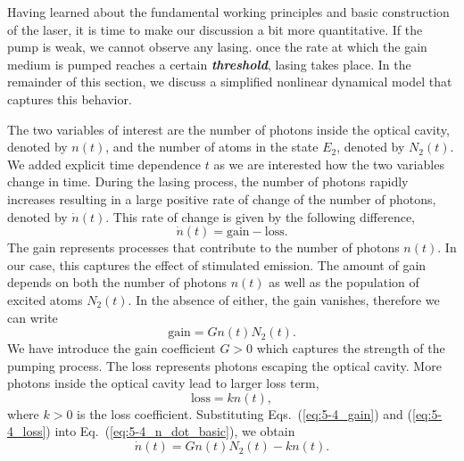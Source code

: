 Having learned about the fundamental working principles and basic construction of the laser, it is time to make our discussion a bit more quantitative.
If the pump is weak, we cannot observe any lasing.
once the rate at which the gain medium is pumped reaches a certain \textit{\textbf{threshold}}, lasing takes place.
In the remainder of this section, we discuss a simplified nonlinear dynamical model that captures this behavior.

The two variables of interest are the number of photons inside the optical cavity, denoted by $n(t)$, and the number of atoms in the state $E_2$, denoted by $N_2(t)$.
We added explicit time dependence $t$ as we are interested how the two variables change in time.
During the lasing process, the number of photons rapidly increases resulting in a large  positive rate of change of the number of photons, denoted by $\dot{n}(t)$.
This rate of change is given by the following difference,
\begin{equation}
    \dot{n}(t) = \text{gain} - \text{loss}.
    \label{eq:5-4_n_dot_basic}
\end{equation}
The gain represents processes that contribute to the number of photons $n(t)$.
In our case, this captures the effect of stimulated emission.
The amount of gain depends on both the number of photons $n(t)$ as well as the population of excited atoms $N_2(t)$.
In the absence of either, the gain vanishes, therefore we can write
\begin{equation}
    \text{gain} = G n (t) N_2(t).
    \label{eq:5-4_gain}
\end{equation}
We have introduce the gain coefficient $G>0$ which captures the strength of the pumping process.
The loss represents photons escaping the optical cavity.
More photons inside the optical cavity lead to larger loss term,
\begin{equation}
    \text{loss} = k n(t),
    \label{eq:5-4_loss}
\end{equation}
where $k>0$ is the loss coefficient.
Substituting Eqs.~(\ref{eq:5-4_gain}) and (\ref{eq:5-4_loss}) into Eq.~(\ref{eq:5-4_n_dot_basic}), we obtain
\begin{equation}
    \dot{n}(t) = G n(t) N_2(t) - k n(t).
    \label{eq:5-4_n_dot_detailed}
\end{equation}


